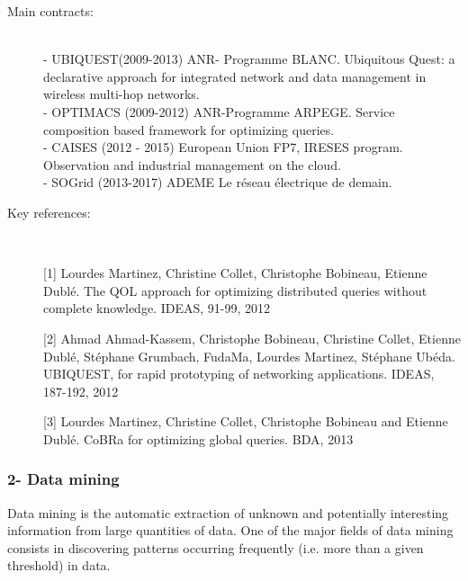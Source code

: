 \begin{description}
\item[Main contracts:] \ \\
- UBIQUEST(2009-2013) ANR- Programme BLANC. Ubiquitous Quest: a declarative approach for integrated network and data management in wireless multi-hop networks. \\
- OPTIMACS (2009-2012) ANR-Programme ARPEGE. Service composition based framework for optimizing queries.\\
- CAISES (2012 - 2015) European Union FP7, IRESES program. Observation and industrial management on the cloud.  \\
- SOGrid (2013-2017) ADEME Le r{\'e}seau {\'e}lectrique de demain. 

\item[Key references:]~%

[1]	Lourdes Martinez, Christine Collet, Christophe Bobineau, Etienne Dubl{\'e}. The QOL approach for optimizing distributed queries without complete knowledge. IDEAS, 91-99, 2012

[2] Ahmad Ahmad-Kassem, Christophe Bobineau, Christine Collet, Etienne Dubl{\'e}, St{\'e}phane Grumbach, FudaMa, Lourdes Martinez, St{\'e}phane Ub{\'e}da. UBIQUEST, for rapid prototyping of networking applications. IDEAS, 187-192, 2012

[3] Lourdes Martinez, Christine Collet, Christophe Bobineau and Etienne Dubl{\'e}. CoBRa for optimizing global queries. BDA, 2013


\end{description}

\subsubsection*{2- Data mining}

Data mining is the automatic extraction of unknown and potentially interesting information from large quantities of data. One of the major fields of data mining consists in discovering patterns occurring frequently (i.e. more than a given threshold) in data. 

